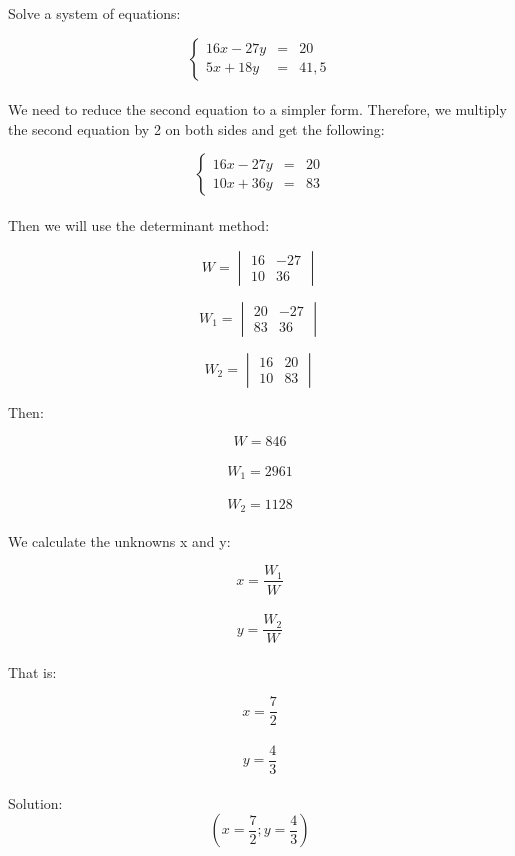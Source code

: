\documentclass{article}
\begin{document}

\normalsize



Solve a system of equations:
    

$$\left\{\begin{array}{rcl}
    16x - 27y&=&20\\
    5x + 18y&=&41,5
    \end{array} \right.$$\\

We need to reduce the second equation to a simpler form. Therefore, we multiply the second equation by 2 on both sides 
and get the following:

$$\left\{\begin{array}{rcl}
    16x - 27y&=&20\\
    10x + 36y&=&83
    \end{array} \right.$$\\


Then we will use the determinant method:

$$W=\begin{vmatrix}
    16&-27 \\ 
    10&36 
   \end{vmatrix}$$

$$W_{1}=\begin{vmatrix}
    20&-27 \\ 
    83& 36
   \end{vmatrix}$$

$$W_{2}=\begin{vmatrix}
    16&20 \\ 
    10&83
   \end{vmatrix}$$

Then:

$$W=846$$\\
$$W_{1}=2 961$$\\
$$W_{2}=1 128$$\\

We calculate the unknowns x and y:

$$x=\frac{W_{1}}{W}$$\\
$$y=\frac{W_{2}}{W}$$\\

That is:

$$x=\frac{7}{2}$$\\
$$y=\frac{4}{3}$$\\

Solution: $$\left ({x=\frac{7}{2}} ;{y=\frac{4}{3}}  \right )$$
\end{document}
